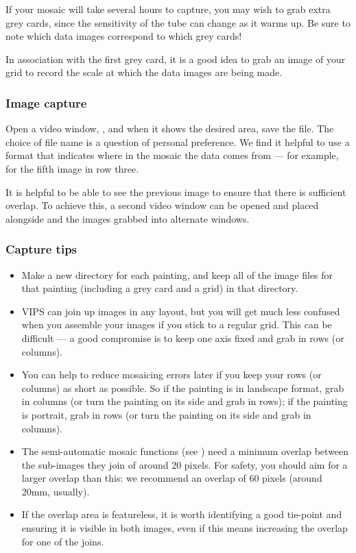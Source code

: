 If your mosaic will take several hours to capture, you may wish to grab extra
grey cards, since the sensitivity of the tube can change as it warms
up. Be sure to note which data images correspond to which grey cards!

In association with the first grey card, it is a good idea to grab an image of
your grid to record the scale at which the data images are being made.

\subsubsection{Image capture}

Open a video window, ,
and when it shows the desired area, save the file. The choice of file name
is a question of personal preference. We find it helpful to use a format
that indicates where in the mosaic the data comes from --- for example,
 for the fifth image in row three.

It is helpful to be able to see the previous image to ensure that there is
sufficient overlap. To achieve this, a second video window can be opened and
placed alongside and the images grabbed into alternate windows.

\subsubsection{Capture tips}

\begin{itemize}

\item
Make a new directory for each painting, and keep all of the image files
for that painting (including a grey card and a grid) in that directory.

\item
VIPS can join up images in any layout, but you will get much less confused
when you assemble your images if you stick to a regular grid. This can be
difficult --- a good compromise is to keep one axis fixed and grab in rows
(or columns).

\item
You can help to reduce mosaicing errors later if you keep your rows (or
columns) as short as possible. So if the painting is in landscape format, grab
in columns (or turn the painting on its side and grab in rows); if the
painting is portrait, grab in rows (or turn the painting on its side and grab
in columns).

\item
The semi-automatic mosaic functions (see ) need a minimum
overlap between the sub-images they join of around 20 pixels. For safety, you
should aim for a larger overlap than this: we recommend an overlap
of 60 pixels (around 20mm, usually).

\item
If the overlap area is featureless, it is worth identifying a good tie-point
and ensuring it is visible in both images, even if this means increasing the
overlap for one of the joins.

\end{itemize}

